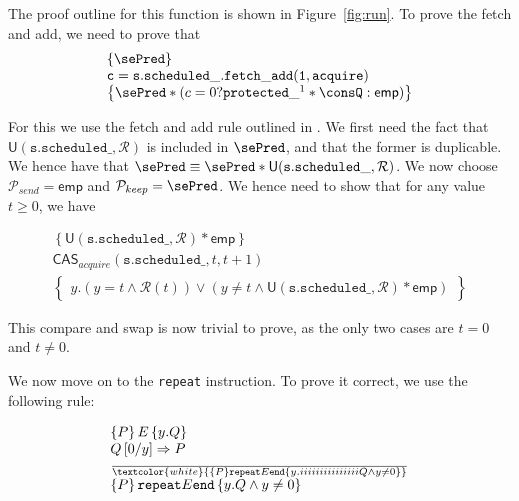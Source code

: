 The proof outline for this function is shown in Figure~\ref{fig:run}. To prove the fetch and add, we need to prove that
\begin{equation*}
		\begin{array}{l}
	\left\{\sePred \right\} \\
		\mathtt{c = s.scheduled\_.fetch\_add(1, acquire)} \\
		\left\{ \sePred * (c = 0 ? \mathtt{protected\_}^1 * \consQ : \mathsf{emp}) \right\}
\end{array}
\end{equation*}

For this we use the fetch and add rule outlined in \cite{fsl}. We first need the fact that $\mathsf{U}(\mathtt{s.scheduled\_}, \mathcal{R})$ is included in $\sePred$, and that the former is duplicable. We hence have that $\sePred \equiv \sePred * \mathsf{U}(\mathtt{s.scheduled\_}, \mathcal{R})$. We now choose $\mathcal{P}_{send} = \mathsf{emp}$ and $\mathcal{P}_{keep} = \sePred$. We hence need to show that for any value $t \geq 0$, we have

\begin{equation*}
		\begin{array}{l}
		\left\{ \mathsf{U}(\mathtt{s.scheduled\_}, \mathcal{R}) * \mathsf{emp}
		\right\}\\
				\mathsf{CAS}_{acquire}(\mathtt{s.scheduled\_}, t, t + 1) \\
		\left\{
				\begin{array}{l}
						y. (y = t \land \mathcal{R}(t)) \lor (y \neq t \land \mathsf{U}(\mathtt{s.scheduled\_}, \mathcal{R}) * \mathsf{emp})
				\end{array}
		\right\}
		\end{array}
\end{equation*}

This compare and swap is now trivial to prove, as the only two cases are $t = 0$ and $t \neq 0$.

We now move on to the \texttt{repeat} instruction. To prove it correct, we use the following rule:

\begin{equation*}
		\begin{array}{l}
			\left\{P\right\} E \left\{y.Q\right\} \\
			Q\left[0 / y \right] \Rightarrow P \\
				\frac{}{\textcolor{white}{\left\{ P\right\} \texttt{repeat} E \texttt{end} \left\{ y.iiiiiiiiiiiiiii Q \land y \neq 0 \right\}}}\\
			\left\{ P\right\} \texttt{repeat} E \texttt{end} \left\{ y. Q \land y \neq 0 \right\}
		\end{array}
\end{equation*}

